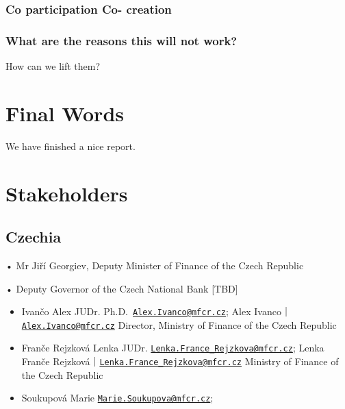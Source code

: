 \documentclass[
]{book}
\begin{document}
\hypertarget{co-participation-co--creation}{%
\subsection{Co participation \textbar{} Co- creation}\label{co-participation-co--creation}}

\hypertarget{what-are-the-reasons-this-will-not-work}{%
\subsection{What are the reasons this will not work?}\label{what-are-the-reasons-this-will-not-work}}

How can we lift them?

\hypertarget{final-words}{%
\chapter{Final Words}\label{final-words}}

We have finished a nice report.

\hypertarget{stakeholders}{%
\chapter{Stakeholders}\label{stakeholders}}

\hypertarget{czechia}{%
\section{Czechia}\label{czechia}}

• Mr Jiří Georgiev, Deputy Minister of Finance of the Czech Republic

• Deputy Governor of the Czech National Bank {[}TBD{]}

\begin{itemize}
\item
  Ivančo Alex JUDr. Ph.D.~\href{mailto:Alex.Ivanco@mfcr.cz}{\nolinkurl{Alex.Ivanco@mfcr.cz}};
  Alex Ivanco｜\href{mailto:Alex.Ivanco@mfcr.cz}{\nolinkurl{Alex.Ivanco@mfcr.cz}}
  Director, Ministry of Finance of the Czech Republic
\item
  Franče Rejzková Lenka JUDr. \href{mailto:Lenka.France_Rejzkova@mfcr.cz}{\nolinkurl{Lenka.France\_Rejzkova@mfcr.cz}};
  Lenka Franče Rejzková｜\href{mailto:Lenka.France_Rejzkova@mfcr.cz}{\nolinkurl{Lenka.France\_Rejzkova@mfcr.cz}}
  Ministry of Finance of the Czech Republic
\item
  Soukupová Marie \href{mailto:Marie.Soukupova@mfcr.cz}{\nolinkurl{Marie.Soukupova@mfcr.cz}};
\end{itemize}
\end{document}
